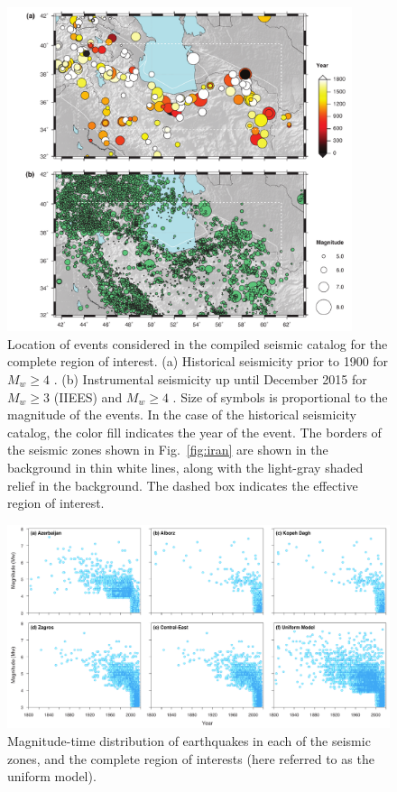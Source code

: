 
\begin{figure}[t]
	\centering
	\includegraphics[width=0.9\textwidth]{figures/pdf/figure-03}
	\caption{Location of events considered in the compiled seismic catalog for the complete region of interest. (a) Historical seismicity prior to 1900 for $M_w \geq 4$ \citep[after][]{Zare2014}. (b) Instrumental seismicity up until December 2015 for $M_w \geq 3$ (IIEES) and $M_w \geq 4$ \citep[after][]{Zare2014}. Size of symbols is proportional to the magnitude of the events. In the case of the historical seismicity catalog, the color fill indicates the year of the event. The borders of the seismic zones shown in Fig.~\ref{fig:iran} are shown in the background in thin white lines, along with the light-gray shaded relief in the background. The dashed box indicates the effective region of interest.}
	\label{fig:catalog}
\end{figure}

\begin{figure}[t]
	\centering
	\includegraphics[width=\textwidth]{figures/pdf/figure-04}
	\caption{Magnitude-time distribution of earthquakes in each of the seismic zones, and the complete region of interests (here referred to as the uniform model).}
	\label{fig:scatter}
\end{figure}

